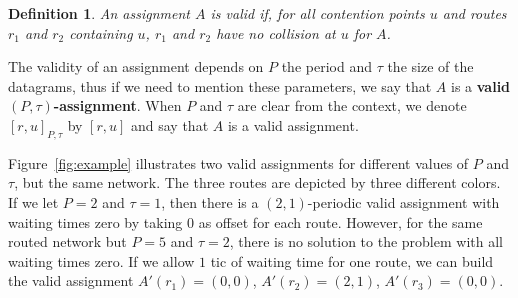 \documentclass[a4paper,10pt]{journal}
\newtheorem{definition}{Definition}
\begin{document}
    \begin{definition}
    An assignment $A$ is valid if, for all contention points $u$ and routes $r_1$ and $r_2$ containing $u$, $r_1$ and $r_2$ have no collision at $u$ for $A$. 
    \end{definition}

    The validity of an assignment depends on $P$ the period and $\tau$ the size of the datagrams, thus if we need to mention these parameters, we say that $A$ is a \textbf{valid $(P,\tau)$-assignment}. When $P$ and $\tau$ are clear from the context, we denote $[r,u]_{P,\tau}$ by $[r,u]$ and say that $A$ is a valid assignment. 

\begin{examplee}

    Figure~\ref{fig:example} illustrates two valid assignments for different values of $P$ and $\tau$, but the same network. The three routes are depicted by three different colors. If we let $P = 2$ and $\tau = 1$, then there is a $(2,1)$-periodic valid assignment with waiting times zero by taking $0$ as offset for each route. However, for the same routed network but $P=5$ and $\tau = 2$, there is no solution to the problem with all waiting times zero. If we allow $1$ tic of waiting time for one route, we can build the valid assignment $A'(r_1) = (0,0)$, $A'(r_2) = (2,1)$, $A'(r_3)= (0,0)$.

\end{examplee}
  
\end{document}
